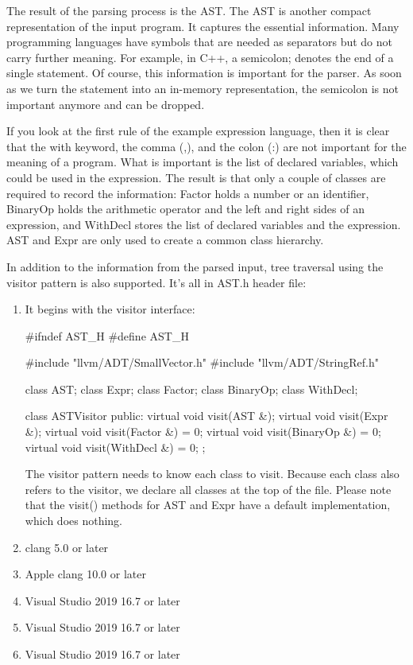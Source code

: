 
The result of the parsing process is the AST. The AST is another compact representation of the input program. It captures the essential information. Many programming languages have symbols that are needed as separators but do not carry further meaning. For example, in C++, a semicolon; denotes the end of a single statement. Of course, this information is important for the parser. As soon as we turn the statement into an in-memory representation, the semicolon is not important anymore and can be dropped.

If you look at the first rule of the example expression language, then it is clear that the with keyword, the comma (,), and the colon (:) are not important for the meaning of a program. What is important is the list of declared variables, which could be used in the expression. The result is that only a couple of classes are required to record the information: Factor holds a number or an identifier, BinaryOp holds the arithmetic operator and the left and right sides of an expression, and WithDecl stores the list of declared variables and the expression. AST and Expr are only used to create a common class hierarchy.

In addition to the information from the parsed input, tree traversal using the visitor pattern is also supported. It’s all in AST.h header file:

\begin{enumerate}
\item
It begins with the visitor interface:

\begin{cpp}
#ifndef AST_H
#define AST_H

#include "llvm/ADT/SmallVector.h"
#include "llvm/ADT/StringRef.h"

class AST;
class Expr;
class Factor;
class BinaryOp;
class WithDecl;

class ASTVisitor {
    public:
    virtual void visit(AST &){};
    virtual void visit(Expr &){};
    virtual void visit(Factor &) = 0;
    virtual void visit(BinaryOp &) = 0;
    virtual void visit(WithDecl &) = 0;
};
\end{cpp}

The visitor pattern needs to know each class to visit. Because each class also refers to the visitor, we declare all classes at the top of the file. Please note that the visit() methods for AST and Expr have a default implementation, which does nothing.

\item
clang 5.0 or later

\item
Apple clang 10.0 or later

\item
Visual Studio 2019 16.7 or later

\item
Visual Studio 2019 16.7 or later

\item
Visual Studio 2019 16.7 or later

\end{enumerate}
